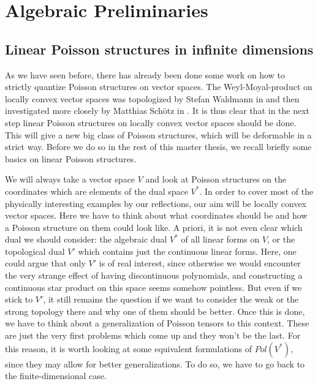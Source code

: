 
%
%

\chapter{Algebraic Preliminaries}


\section{Linear Poisson structures in infinite dimensions}
\label{sec:chap3_LinearPoisson}

As we have seen before, there has already been done some work on how to 
strictly quantize Poisson structures on vector spaces. The Weyl-Moyal-product 
on locally convex vector spaces was topologized by Stefan Waldmann in 
\cite{waldmann:2014a} and then investigated more closely by Matthias 
Schötz in \cite{schoetz:2014a}. It is thus clear that in the next step 
linear Poisson structures on locally convex vector spaces should be done. This 
will give a new big class of Poisson structures, which will be deformable in a 
strict way. Before we do so in the rest of this master thesis, we recall 
briefly some basics on linear Poisson structures.


We will always take a vector space $V$ and look at Poisson structures on the 
coordinates which are elements of the dual space $V^*$. In order to cover most 
of the physically interesting examples by our reflections, our aim will be 
locally convex vector spaces. Here we have to think about what coordinates 
should be and how a Poisson structure on them could look like. A priori, it is 
not even clear which dual we should consider: the algebraic dual $V^*$ of all 
linear forms on $V$, or the topological dual $V'$ which contains just the 
continuous linear forms. Here, one could argue that only $V'$ is of real 
interest, since otherwise we would encounter the very strange effect of having 
discontinuous polynomials, and constructing a continuous star product on this 
space seems somehow pointless. But even if we stick to $V'$, it still remains 
the question if we want to consider the weak or the strong topology there and 
why one of them should be better. Once this is done, we have to think about a 
generalization of Poisson tensors to this context. These are just the very 
first problems which come up and they won't be the last. For this reason, it 
is worth looking at some equivalent formulations of $Pol(V^*)$, since they 
may allow for better generalizations. To do so, we have to go back to the 
finite-dimensional case.


